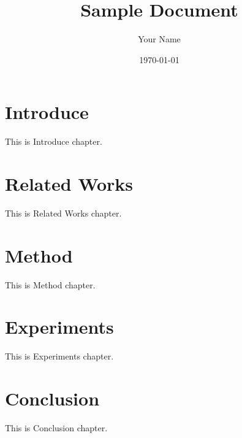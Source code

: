 \documentclass[twocolumn]{article}
\title{Sample Document}
\author{Your Name}
\date{\today}
\begin{document}

\section{Introduce}
This is Introduce chapter.

\section{Related Works}
This is Related Works chapter.

\section{Method}
This is Method chapter.

\section{Experiments}
This is Experiments chapter.

\section{Conclusion}
This is Conclusion chapter.
\end{document}
